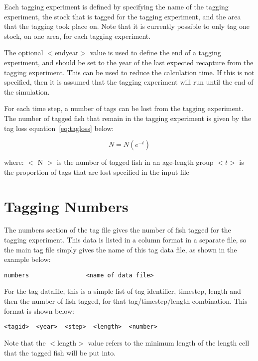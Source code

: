 \documentclass [a4paper, 10pt]{book}
\begin{document}
Each tagging experiment is defined by specifying the name of the tagging experiment, the stock that is tagged for the tagging experiment, and the area that the tagging took place on.  Note that it is currently possible to only tag one stock, on one area, for each tagging experiment.

\bigskip
The optional $<$endyear$>$ value is used to define the end of a tagging experiment, and should be set to the year of the last expected recapture from the tagging experiment.  This can be used to reduce the calculation time.  If this is not specified, then it is assumed that the tagging experiment will run until the end of the simulation.

\bigskip
For each time step, a number of tags can be lost from the tagging experiment.  The number of tagged fish that remain in the tagging experiment is given by the tag loss equation~\ref{eq:tagloss} below:

\begin{equation}\label{eq:tagloss}
N = N (e^{-t})
\end{equation}

where:\newline
$<$ N $>$ is the number of tagged fish in an age-length group\newline
$<t>$ is the proportion of tags that are lost specified in the input file

\section{Tagging Numbers}\label{sec:tagnumbers}
The numbers section of the tag file gives the number of fish tagged for the tagging experiment.  This data is listed in a column format in a separate file, so the main tag file simply gives the name of this tag data file, as shown in the example below:

{\small\begin{verbatim}
numbers                <name of data file>
\end{verbatim}}

For the tag datafile, this is a simple list of tag identifier, timestep, length and then the number of fish tagged, for that tag/timestep/length combination.  This format is shown below:

{\small\begin{verbatim}
<tagid>  <year>  <step>  <length>  <number>
\end{verbatim}}

Note that the $<$length$>$ value refers to the minimum length of the length cell that the tagged fish will be put into.
\end{document}
